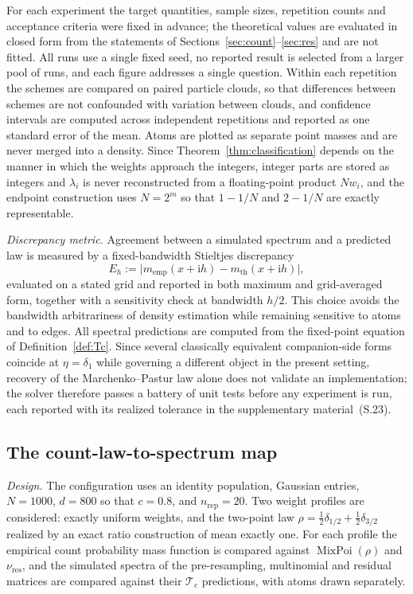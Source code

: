 \documentclass[lettersize,journal]{IEEEtran}
\theoremstyle{remark}
\begin{document}
For each experiment the target quantities, sample sizes, repetition counts
and acceptance criteria were fixed in advance; the theoretical values are
evaluated in closed form from the statements of
Sections~\ref{sec:count}--\ref{sec:res} and are not fitted. All runs use a
single fixed seed, no reported result is selected from a larger pool of runs,
and each figure addresses a single question. Within each repetition the
schemes are compared on paired particle clouds, so that differences between
schemes are not confounded with variation between clouds, and confidence
intervals are computed across independent repetitions and reported as one
standard error of the mean. Atoms are plotted as separate point masses and are
never merged into a density. Since Theorem~\ref{thm:classification} depends on
the manner in which the weights approach the integers, integer parts are
stored as integers and $\lambda_i$ is never reconstructed from a
floating-point product $Nw_i$, and the endpoint construction uses $N=2^m$ so
that $1-1/N$ and $2-1/N$ are exactly representable.

\emph{Discrepancy metric.} Agreement between a simulated spectrum and a
predicted law is measured by a fixed-bandwidth Stieltjes discrepancy
\begin{equation}
  E_h := \big| m_{\mathrm{emp}}(x+\mathrm{i}h)
    - m_{\mathrm{th}}(x+\mathrm{i}h) \big|,
  \label{eq:Eh}
\end{equation}
evaluated on a stated grid and reported in both maximum and grid-averaged
form, together with a sensitivity check at bandwidth $h/2$. This choice avoids
the bandwidth arbitrariness of density estimation while remaining sensitive to
atoms and to edges. All spectral predictions are computed from the fixed-point
equation of Definition~\ref{def:Tc}. Since several classically equivalent
companion-side forms coincide at $\eta=\delta_1$ while governing a different
object in the present setting, recovery of the Marchenko--Pastur law alone
does not validate an implementation; the solver therefore passes a battery of
unit tests before any experiment is run, each reported with its realized
tolerance in the supplementary material~(S.23).
\subsection{The count-law-to-spectrum map}
\label{sec:ix-e1}

\emph{Design.} The configuration uses an identity population, Gaussian
entries, $N=1000$, $d=800$ so that $c=0.8$, and $n_{\mathrm{rep}}=20$. Two
weight profiles are considered: exactly uniform weights, and the two-point law
$\rho=\tfrac12\delta_{1/2}+\tfrac12\delta_{3/2}$ realized by an exact ratio
construction of mean exactly one. For each profile the empirical count
probability mass function is compared against $\operatorname{MixPoi}(\rho)$ and
$\nu_{\mathrm{res}}$, and the simulated spectra of the pre-resampling,
multinomial and residual matrices are compared against their $\mathcal{T}_c$
predictions, with atoms drawn separately.
\end{document}

